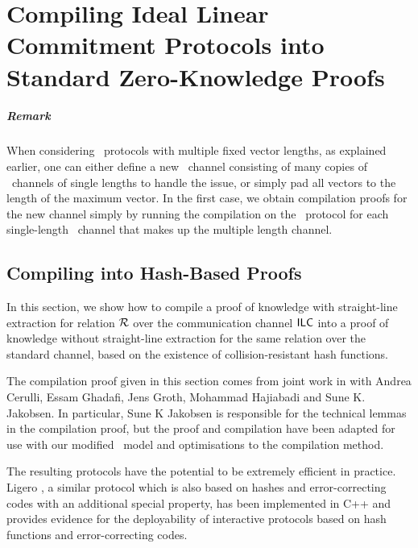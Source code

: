 \chapter{Compiling Ideal Linear Commitment Protocols into Standard Zero-Knowledge Proofs}
\label{chapterlabel:Compilation-Proof}

\paragraph{Remark} When considering \ILC\ protocols with multiple fixed vector lengths, as explained earlier, one can either define a new \ILC\ channel consisting of many copies of \ILC\ channels of single lengths to handle the issue, or simply pad all vectors to the length of the maximum vector. In the first case, we obtain compilation proofs for the new channel simply by running the compilation on the \ILC\ protocol for each single-length \ILC\ channel that makes up the multiple length channel.
%

\section{Compiling into Hash-Based Proofs}
\label{sec:IPCPgencon}\label{sec:ILCtoIOP}
In this section, we show how to compile a proof of knowledge with straight-line extraction for relation $\mathcal{R}$ over the communication channel $\mathsf{ILC}$ into a proof of knowledge without straight-line extraction for the same relation over the standard channel, based on the existence of collision-resistant hash functions.

The compilation proof given in this section comes from joint work in \cite{BootleCGGHJ17} with Andrea Cerulli, Essam Ghadafi, Jens Groth, Mohammad Hajiabadi and Sune K. Jakobsen. In particular, Sune K Jakobsen is responsible for the technical lemmas in the compilation proof, but the proof and compilation have been adapted for use with our modified \ILC\ model and optimisations to the compilation method.

The resulting protocols have the potential to be extremely efficient in practice. Ligero \cite{CCS:AHIV17}, a similar protocol which is also based on hashes and error-correcting codes with an additional special property, has been implemented in C++ and provides evidence for the deployability of interactive protocols based on hash functions and error-correcting codes.


